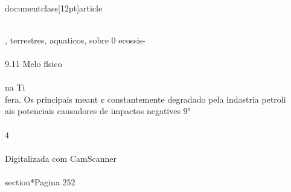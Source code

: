 \\documentclass[12pt]{article}
\begin{document}
\\
, terrestres, aquaticos, sobre 0 ecossis-\\
\\
9.11 Melo flsico\\
\\
na Ti\\
fera. Os principais meant ¢ constantemente degradado pela indastria petroli\\
ais potenciais causadores de impactos negatives 9°\\
\\
4\\
\\
Digitalizada com CamScanner\\

\\section*{Pagina 252}
\end{document}
